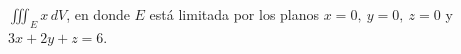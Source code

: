 \item $\iiint_E x \, dV$, en donde $E$ está limitada por los planos $x = 0, \ y = 0, \ z = 0$ y $3x + 2y + z = 6$.
